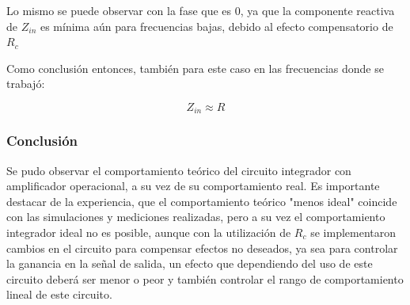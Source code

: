 Lo mismo se puede observar con la fase que es 0, ya que la componente reactiva de $Z_{in}$ es mínima aún para frecuencias bajas, debido al efecto
compensatorio de $R_c$

Como conclusión entonces, también para este caso en las frecuencias donde se trabajó:

$$Z_{in} \approx R$$

\subsubsection{Conclusión}

Se pudo observar el comportamiento teórico del circuito integrador con amplificador operacional, a su vez de su comportamiento real.
Es importante destacar de la experiencia, que el comportamiento teórico "menos ideal" coincide con las simulaciones y mediciones realizadas, pero a su vez
el comportamiento integrador ideal no es posible, aunque con la utilización de $R_c$ se implementaron cambios en el circuito para compensar efectos no deseados,
ya sea para controlar la ganancia en la señal de salida, un efecto que dependiendo del uso de este circuito deberá ser menor o peor y también controlar el rango
de comportamiento lineal de este circuito. 

